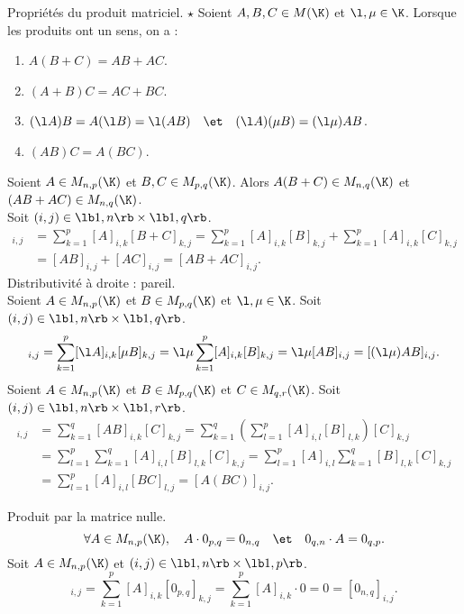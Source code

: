 \documentclass[11pt]{article}
\begin{document}
\begin{prop}{Propriétés du produit matriciel. $\star$}{}
    Soient $A,B,C\in M(\K)$ et $\l,\mu\in\K$. Lorsque les produits ont un sens, on a :
    \begin{enumerate}
        \item $A(B+C)=AB+AC$.
        \item $(A+B)C=AC+BC$.
        \item $(\l A)B = A(\l B) = \l(AB)\quad\et\quad (\l A)(\mu B)=(\l \mu)AB$.
        \item $(AB)C=A(BC)$.
    \end{enumerate}
    \tcblower
     Soient $A\in M_{n,p}(\K)$ et $B,C\in M_{p,q}(\K)$. Alors $A(B+C)\in M_{n,q}(\K)$ et $(AB+AC)\in M_{n,q}(\K)$.\\
    Soit $(i,j)\in\lb1,n\rb\times\lb1,q\rb$.
    \begin{align*}
        [A(B+C)]_{i,j}&=\sum_{k=1}^p[A]_{i,k}[B+C]_{k,j}=\sum_{k=1}^p[A]_{i,k}[B]_{k,j}+\sum_{k=1}^p[A]_{i,k}[C]_{k,j}\\
        &=[AB]_{i,j}+[AC]_{i,j}=[AB+AC]_{i,j}.
    \end{align*}
     Distributivité à droite : pareil.\\
     Soient $A\in M_{n,p}(\K)$ et $B\in M_{p,q}(\K)$ et $\l,\mu\in\K$. Soit $(i,j)\in\lb1,n\rb\times\lb1,q\rb$.
    \begin{equation*}
        [(\l A)(\mu B)]_{i,j}=\sum_{k=1}^p[\l A]_{i,k}[\mu B]_{k,j}=\l \mu \sum_{k=1}^p[A]_{i,k}[B]_{k,j}=\l\mu[AB]_{i,j}=[(\l \mu)AB]_{i,j}.
    \end{equation*}
    \boxed{\star} Soient $A\in M_{n,p}(\K)$ et $B\in M_{p,q}(\K)$ et $C\in M_{q,r}(\K)$. Soit $(i,j)\in\lb1,n\rb\times\lb1,r\rb$.
    \begin{align*}
        [(AB)C]_{i,j} &= \sum_{k=1}^q[AB]_{i,k}[C]_{k,j}=\sum_{k=1}^q\left(\sum_{l=1}^p[A]_{i,l}[B]_{l,k}\right)[C]_{k,j}\\
        &=\sum_{l=1}^p\sum_{k=1}^q[A]_{i,l}[B]_{l,k}[C]_{k,j}=\sum_{l=1}^p[A]_{i,l}\sum_{k=1}^q[B]_{l,k}[C]_{k,j}\\
        &=\sum_{l=1}^p[A]_{i,l}[BC]_{l,j}=[A(BC)]_{i,j}.
    \end{align*}
\end{prop}

\begin{prop}{Produit par la matrice nulle.}{}
    \begin{equation*}
        \forall A \in M_{n,p}(\K), \quad A\cdot0_{p,q}=0_{n,q} \quad\et\quad 0_{q,n}\cdot A=0_{q,p}.
    \end{equation*}
    \tcblower
    Soit $A\in M_{n,p}(\K)$ et $(i,j)\in\lb1,n\rb\times\lb1,p\rb$.
    \begin{equation*}
        [A\cdot0_{p,q}]_{i,j}=\sum_{k=1}^p[A]_{i,k}[0_{p,q}]_{k,j}=\sum_{k=1}^p[A]_{i,k}\cdot0=0=[0_{n,q}]_{i,j}.
    \end{equation*}
\end{prop}
\end{document}
